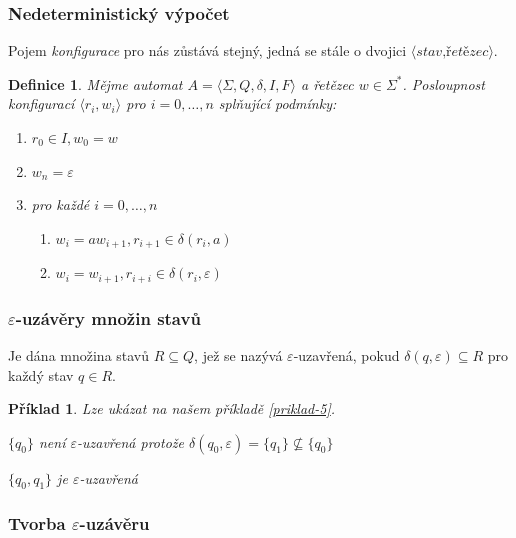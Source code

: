 \documentclass[10pt,a4paper]{article}
\theoremstyle{note}
\newtheorem{definice}{Definice}
\newtheorem{priklad}{Příklad}
\begin{document}
\subsubsection{Nedeterministický výpočet}
Pojem \textit{konfigurace} pro nás zůstává stejný, jedná se stále o dvojici $\langle \textit{stav,řetězec} \rangle$.

\begin{definice}
Mějme automat $A = \langle \Sigma,Q,\delta,I,F \rangle$ a řetězec $w \in \Sigma^*$. Posloupnost konfigurací $\langle r_i,w_i \rangle$ pro $i=0,\ldots,n$ splňující podmínky:
\begin{enumerate}
\item
$r_{0} \in I, w_0=w$
\item
$w_{n} = \varepsilon$
\item
pro každé $i=0,\ldots,n$
\begin{enumerate}
\item
$w_i = aw_{i+1}, r_{i+1} \in \delta(r_i,a)$
\item
$w_i=w_{i+1} , r_{i+i} \in \delta(r_i,\varepsilon)$
\end{enumerate}
\end{enumerate}

\end{definice}

\subsubsection{$\varepsilon$-uzávěry množin stavů}

Je dána množina stavů $R \subseteq Q$, jež se nazývá $\varepsilon$-uzavřená,
pokud $ \delta (q,\varepsilon) \subseteq R$ pro každý stav $ q \in R$.

\begin{priklad}
Lze ukázat na našem příkladě \ref{priklad-5}.

$\lbrace q_0 \rbrace $ není $\varepsilon$-uzavřená protože $\delta(q_0,\varepsilon) = \lbrace q_1 \rbrace \nsubseteq \lbrace q_0 \rbrace$

$\lbrace q_0,q_1 \rbrace$ je $\varepsilon$-uzavřená
\end{priklad}

\subsubsection{Tvorba $\varepsilon$-uzávěru}
\end{document}

